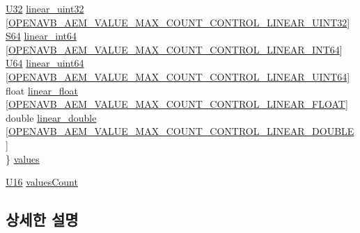 \begin{DoxyCompactItemize}
\begin{tabbing}
\>\hyperlink{openavb__types__base__pub_8h_a696390429f2f3b644bde8d0322a24124}{U32} \hyperlink{structopenavb__aecp__response__data__get__control__t_a3505f0d5403a1f209788246b210d6422}{linear\_uint32} \mbox{[}\hyperlink{openavb__aem__types__pub_8h_a959df5b9317184e15dba0d2c1fd7382c}{OPENAVB\_AEM\_VALUE\_MAX\_COUNT\_CONTROL\_LINEAR\_UINT32}\mbox{]}\\
\>\hyperlink{openavb__types__base__pub_8h_a1d293e5c494dd6826239b02f5fe98e7f}{S64} \hyperlink{structopenavb__aecp__response__data__get__control__t_a6ecce63e7b6ac372b12a08319d5cfb56}{linear\_int64} \mbox{[}\hyperlink{openavb__aem__types__pub_8h_ae00ad286a8aa4b0f37d5e4f1a07e83b2}{OPENAVB\_AEM\_VALUE\_MAX\_COUNT\_CONTROL\_LINEAR\_INT64}\mbox{]}\\
\>\hyperlink{openavb__types__base__pub_8h_a25809e0734a149248fcf5831efa4e33d}{U64} \hyperlink{structopenavb__aecp__response__data__get__control__t_a401addc8dd65267950393edcd4e6e0bf}{linear\_uint64} \mbox{[}\hyperlink{openavb__aem__types__pub_8h_a30cfe39a24c8072db5519b5945a352de}{OPENAVB\_AEM\_VALUE\_MAX\_COUNT\_CONTROL\_LINEAR\_UINT64}\mbox{]}\\
\>float \hyperlink{structopenavb__aecp__response__data__get__control__t_a5a346af0ca505581807d6ed0ec84a85e}{linear\_float} \mbox{[}\hyperlink{openavb__aem__types__pub_8h_aed5cb64f9b113261651036808d6989ff}{OPENAVB\_AEM\_VALUE\_MAX\_COUNT\_CONTROL\_LINEAR\_FLOAT}\mbox{]}\\
\>double \hyperlink{structopenavb__aecp__response__data__get__control__t_a4ac1f60ad606687e4dd294549ff9db69}{linear\_double} \mbox{[}\hyperlink{openavb__aem__types__pub_8h_a272a2e87471f6c68a6b6adce07fb001b}{OPENAVB\_AEM\_VALUE\_MAX\_COUNT\_CONTROL\_LINEAR\_DOUBLE}\mbox{]}\\
\} \hyperlink{structopenavb__aecp__response__data__get__control__t_a9411c1c1077eeefdaa1f763a8831b377}{values}\\

\end{tabbing}\item 
\hyperlink{openavb__types__base__pub_8h_a0a0a322d5fa4a546d293a77ba8b4a71f}{U16} \hyperlink{structopenavb__aecp__response__data__get__control__t_a264345a5327a88764d6dc9b6ad3abc1f}{values\+Count}
\end{DoxyCompactItemize}


\subsection{상세한 설명}


